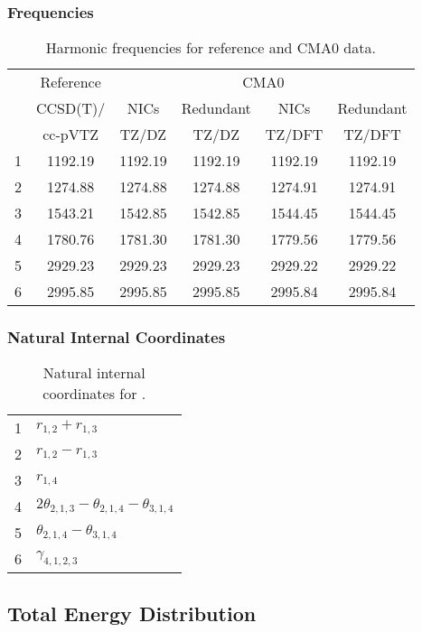 \documentclass[10pt,oneside]{article}
\begin{document}
\begin{table}[h!]
\subsubsection*{Frequencies}
\centering
\caption{Harmonic frequencies for reference and CMA0 data.}
\begin{tabular}{cccccc}
\toprule
{} & Reference & \multicolumn{4}{c}{CMA0} \\
{} &  CCSD(T)/ &    NICs &  Redundant &    NICs & Redundant \\
{} &   cc-pVTZ &   TZ/DZ &      TZ/DZ &  TZ/DFT &    TZ/DFT \\
\midrule
1 &   1192.19 & 1192.19 &    1192.19 & 1192.19 &   1192.19 \\
2 &   1274.88 & 1274.88 &    1274.88 & 1274.91 &   1274.91 \\
3 &   1543.21 & 1542.85 &    1542.85 & 1544.45 &   1544.45 \\
4 &   1780.76 & 1781.30 &    1781.30 & 1779.56 &   1779.56 \\
5 &   2929.23 & 2929.23 &    2929.23 & 2929.22 &   2929.22 \\
6 &   2995.85 & 2995.85 &    2995.85 & 2995.84 &   2995.84 \\
\bottomrule
\end{tabular}
\end{table}

\begin{table}[h!]
\subsubsection*{Natural Internal Coordinates}
\centering
\caption{Natural internal coordinates for .}
\small
\begin{tabular}{ll}
\toprule
  1   & $r_{1,2} + r_{1,3}$ \\
  2   & $r_{1,2} - r_{1,3}$ \\
  3   & $r_{1,4}$ \\
  4   & $2\theta_{2,1,3} - \theta_{2,1,4} - \theta_{3,1,4}$ \\
  5   & $\theta_{2,1,4} - \theta_{3,1,4}$ \\
  6   & $\gamma_{4,1,2,3}$ \\
\bottomrule
\end{tabular}
\end{table}

\begin{table}
\subsection*{Total Energy Distribution}
\centering\end{table}
\end{document}
